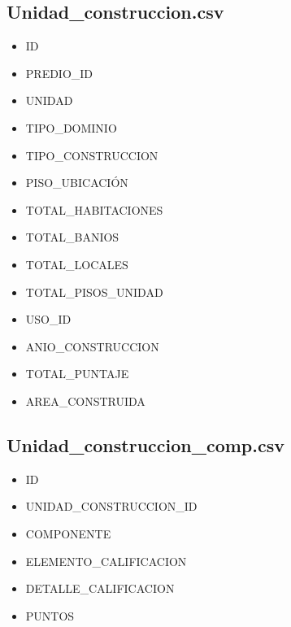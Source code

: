 \documentclass[letterpaper,10pt,spanish]{sphinxmanual}
\begin{document}
\subsection{Unidad\_construccion.csv}
\label{\detokenize{ETL_SNC/Structure:unidad-construccion-csv}}\begin{itemize}
\item {} 
ID

\item {} 
PREDIO\_ID

\item {} 
UNIDAD

\item {} 
TIPO\_DOMINIO

\item {} 
TIPO\_CONSTRUCCION

\item {} 
PISO\_UBICACIÓN

\item {} 
TOTAL\_HABITACIONES

\item {} 
TOTAL\_BANIOS

\item {} 
TOTAL\_LOCALES

\item {} 
TOTAL\_PISOS\_UNIDAD

\item {} 
USO\_ID

\item {} 
ANIO\_CONSTRUCCION

\item {} 
TOTAL\_PUNTAJE

\item {} 
AREA\_CONSTRUIDA

\end{itemize}


\subsection{Unidad\_construccion\_comp.csv}
\label{\detokenize{ETL_SNC/Structure:unidad-construccion-comp-csv}}\begin{itemize}
\item {} 
ID

\item {} 
UNIDAD\_CONSTRUCCION\_ID

\item {} 
COMPONENTE

\item {} 
ELEMENTO\_CALIFICACION

\item {} 
DETALLE\_CALIFICACION

\item {} 
PUNTOS

\end{itemize}
\end{document}
